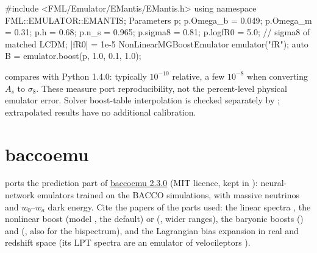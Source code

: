 \begin{cppcode}
#include <FML/Emulator/EMantis/EMantis.h>
using namespace FML::EMULATOR::EMANTIS;
Parameters p;
p.Omega_b = 0.049; p.Omega_m = 0.31; p.h = 0.68; p.n_s = 0.965;
p.sigma8 = 0.81; p.logfR0 = 5.0;   // sigma8 of matched LCDM; |fR0| = 1e-5
NonLinearMGBoostEmulator emulator("fR");
auto B = emulator.boost(p, 1.0, {0.1, 1.0});
\end{cppcode}

\begin{validation}
 compares with Python 1.4.0: typically $10^{-10}$ relative,
a few $10^{-8}$ when converting $A_s$ to $\sigma_8$. These measure port reproducibility,
not the percent-level physical emulator error. Solver boost-table interpolation is checked separately by
; extrapolated results have no additional calibration.
\end{validation}

\section{baccoemu}\label{sec:fit-bacco}

 ports the prediction part of
\href{https://bitbucket.org/rangulo/baccoemu}{baccoemu 2.3.0} (MIT licence, kept in ):
neural-network emulators trained on the BACCO simulations, with massive neutrinos and $w_0$--$w_a$ dark energy. Cite the
papers of the parts used: the linear spectra \cite{Arico2021Linear}, the nonlinear boost \cite{Angulo2021} (model
, the default) or \cite{Arico2023} (, wider ranges), the baryonic boosts
\cite{Arico2021Baryons} () and \cite{Burger2025} (, also for the bispectrum), and the
Lagrangian bias expansion in real \cite{Zennaro2023} and redshift space \cite{PellejeroIbanez2023} (its LPT spectra are an
emulator of velocileptors \cite{Chen2021}).

